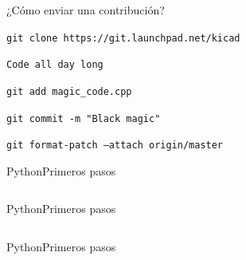 
\begin{frame}{¿Cómo enviar una contribución?}
		\begin{center}
		\begin{minipage}{0.8\textwidth}
			\begin{fullpageitemize}
				\item[\faCode] \texttt{git clone https://git.launchpad.net/kicad} \\
				\pause
				\item[\faCode] \texttt{Code all day long} \\
				\pause
				\item[\faCode] \texttt{git add magic_code.cpp} \\
				\pause
				\item[\faCode] \texttt{git commit -m "Black magic"} \\
				\pause
				\item[\faCode] \texttt{git format-patch --attach origin/master}
			\end{fullpageitemize}
		\end{minipage}
	\end{center}	
\end{frame}



\begin{frame}{Python}{Primeros pasos}
	  \begin{center}
		\begin{minipage}{0.8\textwidth}
			\inputminted[fontsize=\Large]{python}{code/python/start.py}
		\end{minipage}
	\end{center}
\end{frame}

\begin{frame}{Python}{Primeros pasos}
	\inputminted[fontsize=\large]{python}{code/python/nets.py}
\end{frame}

\begin{frame}{Python}{Primeros pasos}
\begin{center}
	\begin{minipage}{0.9\textwidth}
		\inputminted[fontsize=\large]{python}{code/python/nets2.py}
	\end{minipage}
\end{center}
\end{frame}

